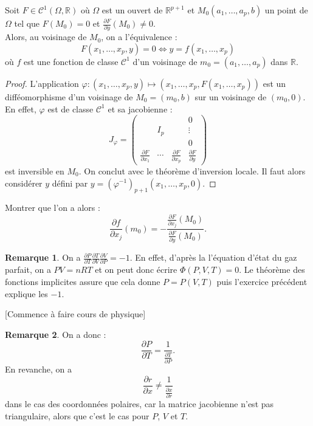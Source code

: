 \documentclass[french]{article}
\newcommand{\R}{\mathbb{R}}
\newcommand{\inv}{^{-1}}
\theoremstyle{plain}
\theoremstyle{definition}
\newtheorem*{rmq}{Remarque}
\theoremstyle{remark}
\begin{document}
\begin{thm}%
	Soit $F\in\mathcal{C}^1(\Omega,\R)$ où $\Omega$ est un ouvert de $\R^{p+1}$ et $M_0(a_1,\ldots,a_p,b)$ un point de $\Omega$ tel que $F(M_0)=0$ et $\displaystyle\frac{\partial F}{\partial y}(M_0)\ne0$. \\
	Alors, au voisinage de $M_0$, on a l'équivalence :
	$$F(x_1,\ldots,x_p,y)=0\iff y=f(x_1,\ldots,x_p)$$ où $f$ est une fonction de classe $\mathcal{C}^1$ d'un voisinage de $m_0=(a_1,\ldots,a_p)$ dans $\R$.
\end{thm}
\begin{proof}
	L'application $\varphi:(x_1,\ldots,x_p,y)\mapsto(x_1,\ldots,x_p,F(x_1,\ldots,x_p))$ est un difféomorphisme d'un voisinage de $M_0=(m_0,b)$ sur un voisinage de $(m_0,0)$. En effet, $\varphi$ est de classe $\mathcal{C}^1$ et sa jacobienne :
	$$J_\varphi=\begin{pmatrix}
		&&&0\\
		&I_p&&\vdots\\
		&&&0\\
		\frac{\partial F}{\partial x_1}&\cdots&\frac{\partial F}{\partial x_p}&\frac{\partial F}{\partial y}
	\end{pmatrix}$$ est inversible en $M_0$. On conclut avec le théorème d'inversion locale. Il faut alors considérer $y$ défini par $y=(\varphi\inv)_{p+1}(x_1,\ldots,x_p,0)$.
\end{proof}

\begin{exo}
	Montrer que l'on a alors :
	$$\frac{\partial f}{\partial x_j}(m_0)=-\frac{\displaystyle\frac{\partial F}{\partial x_j}(M_0)}{\displaystyle\frac{\partial F}{\partial y}(M_0)}.$$
\end{exo}

\begin{rmq}
	On a $\displaystyle\frac{\partial P}{\partial T}\frac{\partial T}{\partial V}\frac{\partial V}{\partial P}=-1$. En effet, d'après la l'équation d'état du gaz parfait, on a $PV=nRT$ et on peut donc écrire $\Phi(P,V,T)=0$. Le théorème des fonctions implicites assure que cela donne $P=P(V,T)$ puis l'exercice précédent explique les $-1$.
\end{rmq}

[Commence à faire cours de physique]

\begin{rmq}
	On a donc :
	$$\frac{\partial P}{\partial T}=\frac{1}{\frac{\partial T}{\partial P}}.$$ En revanche, on a 
	$$\frac{\partial r}{\partial x}\ne\frac{1}{\frac{\partial x}{\partial r}}$$ dans le cas des coordonnées polaires, car la matrice jacobienne n'est pas triangulaire, alors que c'est le cas pour $P$, $V$ et $T$.
\end{rmq}
\end{document}
